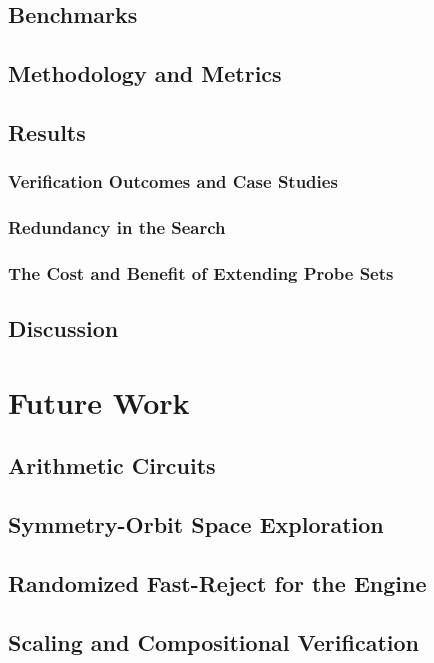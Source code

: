 \documentclass{report}
\begin{document}
\section{Benchmarks}
\section{Methodology and Metrics}
\section{Results}
  \subsection{Verification Outcomes and Case Studies} %
  \subsection{Redundancy in the Search} %
  \subsection{The Cost and Benefit of Extending Probe Sets}
\section{Discussion}

\chapter{Future Work}
\section{Arithmetic Circuits}
\section{Symmetry-Orbit Space Exploration} %
\section{Randomized Fast-Reject for the Engine} %
\section{Scaling and Compositional Verification}
\end{document}
